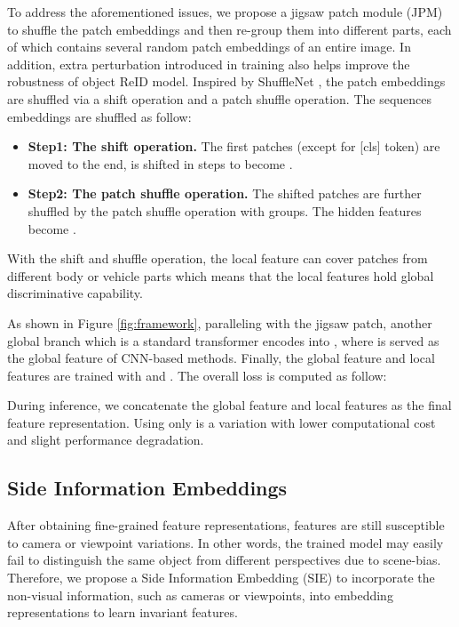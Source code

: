 \documentclass[10pt,twocolumn,letterpaper]{article}
\begin{document}
To address the aforementioned issues, we propose a jigsaw patch module (JPM) to shuffle the patch embeddings and then re-group them into different parts, each of which contains several random patch embeddings of an entire image. In addition, extra perturbation introduced in training also helps improve the robustness of object ReID model.
Inspired by ShuffleNet \cite{zhang2018shufflenet}, the patch embeddings are shuffled via a shift operation and a patch shuffle operation. The sequences embeddings  are shuffled as follow:
\begin{itemize}
\item \textbf{Step1: The shift operation.} The first  patches (except for [cls] token) are moved to the end, \ie  is shifted in  steps to become .
\item \textbf{Step2: The patch shuffle operation.} The shifted patches are further shuffled by the patch shuffle operation with  groups. The hidden features become .
\end{itemize}


With the shift and shuffle operation, the local feature  can cover patches from different body or vehicle parts which means that the local features hold global discriminative capability.



As shown in Figure \ref{fig:framework}, paralleling with the jigsaw patch, another global branch which is a standard transformer encodes  into , where  is served as the global feature of CNN-based methods. Finally, the global feature  and  local features are trained with  and . The overall loss is computed as follow:

\vspace{-1.em}

\vspace{-1.em}

During inference, we concatenate the global feature and local features  as the final feature representation. Using   only is a variation with lower computational cost and slight performance degradation.





\subsection{Side Information Embeddings}\label{ssec:sie}

After obtaining fine-grained feature representations, features are still susceptible to camera or viewpoint variations. In other words, the trained model may easily fail to distinguish the same object from different perspectives due to scene-bias.
Therefore, we propose a Side Information Embedding (SIE) to incorporate the non-visual information, such as cameras or viewpoints, into embedding representations to learn invariant features.
\end{document}
